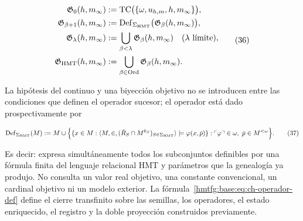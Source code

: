 \[
 \begin{aligned}
  \mathfrak G_0(h,m_\infty)
  &:=\operatorname{TC}\bigl(\{\omega,u_{h,m},h,m_\infty\}\bigr),\\
  \mathfrak G_{\beta+1}(h,m_\infty)
  &:=\operatorname{Def}_{\Sigma_{\rm HMT}}
       \bigl(\mathfrak G_\beta(h,m_\infty)\bigr),\\
  \mathfrak G_\lambda(h,m_\infty)
  &:=\bigcup_{\beta<\lambda}\mathfrak G_\beta(h,m_\infty)
       \quad(\lambda\text{ límite}),\\
  \mathfrak G_{\rm HMT}(h,m_\infty)
  &:=\bigcup_{\beta\in\operatorname{Ord}}
       \mathfrak G_\beta(h,m_\infty).
 \end{aligned}
\tag{36}\label{hmtfg:base:eq:ch-clausura-transfinita}
\]

La hipótesis del continuo y una biyección objetivo no se introducen entre las
condiciones que definen el operador sucesor; el operador está dado
prospectivamente por

\[
 \operatorname{Def}_{\Sigma_{\rm HMT}}(M)
 :=M\cup
 \Bigl\{
   \{x\in M:\langle M,\in,
       (\dot R_S\cap M^{k_S})_{S\in\Sigma_{\rm HMT}}\rangle
       \models\varphi(x,\bar p)\}:
   \ulcorner\varphi\urcorner\in\omega,
   \ \bar p\in M^{<\omega}
 \Bigr\}.
\tag{37}\label{hmtfg:base:eq:ch-operador-def}
\]

Es decir: expresa simultáneamente todos los subconjuntos definibles por una
fórmula finita del lenguaje relacional HMT y parámetros que la genealogía ya
produjo. No
consulta un valor real objetivo, una constante convencional, un cardinal
objetivo ni un modelo exterior. La fórmula~\eqref{hmtfg:base:eq:ch-operador-def} define el cierre transfinito
sobre las semillas, los operadores, el estado enriquecido, el registro y la
doble proyección construidos previamente.

